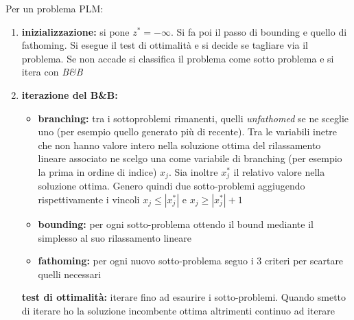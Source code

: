 \message{ !name(ro.tex)}\documentclass[a4paper,12pt, oneside]{book}
\begin{document}
Per un problema PLM:
\begin{shaded}
  \begin{enumerate}
    \item \textbf{inizializzazione:} si pone $z^*=-\infty$. Si fa poi
    il passo di bounding e quello di fathoming. Si esegue il test di
    ottimalità e si decide se tagliare via il problema. Se non accade
    si classifica il problema come sotto problema e si itera con
    \textit{B\&B}
    \item \textbf{iterazione del B\&B:}
    \begin{itemize}
      \item \textbf{branching:} tra i sottoproblemi rimanenti, quelli
      \textit{unfathomed} se ne sceglie uno (per esempio quello
      generato più di recente). Tra le variabili inetre che non hanno
      valore intero nella soluzione ottima del rilassamento lineare
      associato ne scelgo una come variabile di branching (per esempio
      la prima in ordine di indice) $x_j$. Sia inoltre $x_j^*$ il
      relativo valore nella soluzione ottima. Genero quindi due
      sotto-problemi aggiugendo rispettivamente i vincoli $x_j\leq
      |x_j^*|$ e $x_j\geq|x_j^*|+1$
      \item \textbf{bounding:} per ogni sotto-problema ottendo il
      bound mediante il simplesso al suo rilassamento lineare
      \item \textbf{fathoming:} per ogni nuovo sotto-problema seguo i
      3 criteri per scartare quelli necessari
    \end{itemize}
    \textbf{test di ottimalità:} iterare fino ad esaurire i
    sotto-problemi. Quando smetto di iterare ho la soluzione
    incombente ottima altrimenti continuo ad iterare 
  \end{enumerate}
\end{shaded}
\end{document}
